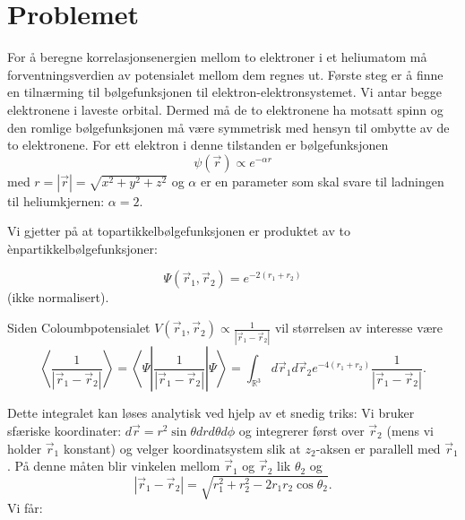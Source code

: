 \documentclass[norsk, 12pt]{article}
\newcommand{\f}{\frac}
\newcommand{\vr}{\vec{r}}
\begin{document}
\section{Problemet}

For å beregne korrelasjonsenergien mellom to elektroner i et heliumatom må forventningsverdien av potensialet mellom
dem regnes ut. Første steg er å finne en tilnærming til bølgefunksjonen til elektron-elektronsystemet. Vi antar begge
elektronene i laveste orbital. Dermed må de to elektronene ha motsatt spinn og den romlige bølgefunksjonen må være
symmetrisk med hensyn til ombytte av de to elektronene. For ett elektron i denne tilstanden er bølgefunksjonen
$$\psi(\vr)\propto e^{-\alpha r}$$
med $r = |\vr| = \sqrt{x^2+y^2+z^2}$ og $\alpha$ er en parameter som skal svare til ladningen til heliumkjernen:
$\alpha = 2$.

Vi gjetter på at topartikkelbølgefunksjonen er produktet av to ènpartikkelbølgefunksjoner:

$$\Psi (\vr_1, \vr_2) = e^{-2(r_1+r_2)}$$
(ikke normalisert).

Siden Coloumbpotensialet $V(\vr_1, \vr_2) \propto \f{1}{|\vr_1-\vr_2|}$ vil størrelsen av interesse være
$$\left\langle\f{1}{|\vr_1-\vr_2|}\right\rangle = \left\langle\Psi\left|\f{1}{|\vr_1-\vr_2|}\right|\Psi\right\rangle
= \int_{\mathbb{R}^3}d\vr_1d\vr_2e^{-4(r_1+r_2)}\f{1}{|\vr_1-\vr_2|}.$$

Dette integralet kan løses analytisk ved hjelp av et snedig triks: Vi bruker sfæriske koordinater:
$d\vr = r^2\sin\theta drd\theta d\phi$
og integrerer først over $\vr_2$ (mens vi holder $\vr_1$ konstant) og velger koordinatsystem slik at
$z_2$-aksen er parallell med $\vr_1$. På denne måten blir vinkelen mellom $\vr_1$ og $\vr_2$ lik $\theta_2$ og 
$$|\vr_1-\vr_2| = \sqrt{r_1^2+r_2^2-2r_1r_2\cos\theta_2}.$$
Vi får:
\end{document}
